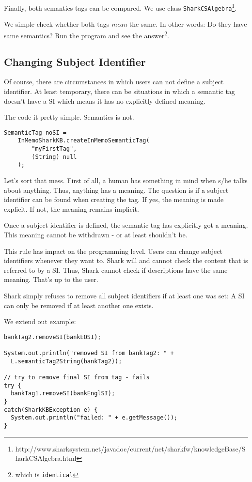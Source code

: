 Finally, both semantics tags can be compared. We use class 
{\tt SharkCSAlgebra}\footnote{http://www.sharksystem.net/javadoc/current/net/sharkfw/knowledgeBase/SharkCSAlgebra.html}.

We simple check whether both tags {\it mean} the same. In other words: 
Do they have same semantics? Run the program and see the answer\footnote{which is {\tt identical}}.

\subsection{Changing Subject Identifier}
Of course, there are circumstances in which users can not define a subject identifier. At least temporary, there can be situations in which a semantic tag doesn't have a SI which means it has no explicitly defined meaning.

The code it pretty simple. Semantics is not.

\begin{verbatim}
SemanticTag noSI = 
    InMemoSharkKB.createInMemoSemanticTag(
        "myFirstTag", 
        (String) null
    );
\end{verbatim}

Let's sort that mess. First of all, a human has something in mind when s/he talks about anything. Thus, anything has a meaning. The question is if a subject identifier can be found when creating the tag. If yes, the meaning is made explicit. If not, the meaning remains implicit. 

Once a subject identifier is defined, the semantic tag has explicitly got a meaning. This meaning cannot be withdrawn - or at least shouldn't be.

This rule has impact on the programming level. Users can change subject identifiers whenever they want to. Shark will and cannot check the content that is referred to by a SI. Thus, Shark cannot check if descriptions have the same meaning. That's up to the user.

Shark simply refuses to remove all subject identifiers if at least one was set: A SI can only be removed if at least another one exists.

We extend out example:
\begin{verbatim}
bankTag2.removeSI(bankEOSI);
  
System.out.println("removed SI from bankTag2: " + 
  L.semanticTag2String(bankTag2));
  
// try to remove final SI from tag - fails
try {
  bankTag1.removeSI(bankEnglSI);
}
catch(SharkKBException e) {
  System.out.println("failed: " + e.getMessage());
}
\end{verbatim}


